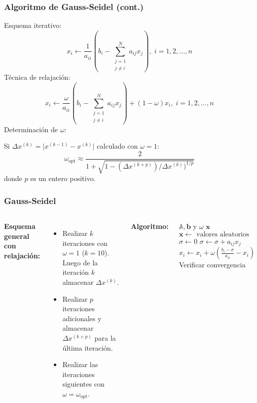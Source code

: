 \documentclass[9pt, aspectratio=169]{beamer}
\begin{document}
\begin{frame}
 \frametitle{Algoritmo de Gauss-Seidel (cont.)}
  
Esquema iterativo:
\begin{equation*}
 x_i \leftarrow \dfrac{1}{a_{ii}} \left( b_i - \sum_{\substack{j=1 \\j \neq i}}^N a_{ij}x_j \right), \;  i = 1, 2, \ldots, n
\end{equation*} \pause
Técnica de relajación:
\begin{equation*}
 x_i \leftarrow \dfrac{\omega}{a_{ii}} \left( b_i - \sum_{\substack{j=1 \\j \neq i}}^N a_{ij}x_j \right) + (1-\omega)x_i, \;  i = 1, 2, \ldots, n
\end{equation*}
Determinación de $\omega$:
\bigskip

Si $\Delta x^{(k)} = \vert x^{(k-1)}-x^{(k)} \vert$ calculado con $\omega = 1$:
\begin{equation*}
 \omega_{\text{opt}} \approx \dfrac{2}{1+\sqrt{1-(\Delta x^{(k+p)})/\Delta x^{(k)})^{1/p}}}
\end{equation*}
donde $p$ es un entero positivo.
\end{frame}

\begin{frame}
 \frametitle{Gauss-Seidel}

\begin{columns}[t]
  \cx
\textbf{Esquema general con relajación:} \bigskip
\begin{itemize}
 \item Realizar $k$ iteraciones con $\omega = 1$ ($k = 10$). Luego de la iteración $k$ almacenar $\Delta x^{(k)}$. \medskip
 \item Realizar $p$ iteraciones adicionales y almacenar $\Delta x^{(k+p)}$ para la última iteración. \medskip
 \item Realizar las iteraciones siguientes con $\omega = \omega_{\text{opt}}$.
\end{itemize} \pause
  \cx
  \textbf{Algoritmo:} \bigskip
\begin{algorithmic}[1]
 \Require $\mathbb{A}, \mathbf{b}$ y $\omega$ 
 \Ensure $\mathbf{x}$ 
 \State $\mathbf{x} \gets \text{ valores aleatorios}$
\Repeat
    \State $\sigma \gets 0$
	\State $\sigma \gets \sigma + a_{ij} x_j$
       \EndIf
    \EndFor {}
    \State $x_i \gets x_i+\omega \left( \frac{b_i - \sigma}{a_{ii}} - x_i \right)$
  \EndFor {}
  \State Verificar convergencia
\end{algorithmic}
\end{columns}
\end{frame} 
\end{document}
